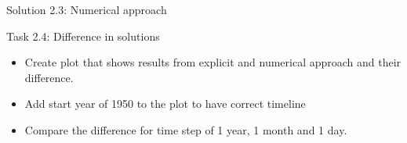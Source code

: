 \begin{frame}[fragile]{Solution 2.3:  Numerical approach } 
\end{frame}


\begin{frame}{Task 2.4: Difference in solutions}
\begin{itemize}
    \item Create plot that shows results from explicit and numerical approach and their difference. 
    \item Add start year of 1950 to the plot to have correct timeline
    \item Compare the difference for time step of 1 year, 1 month and 1 day.
\end{itemize}

\end{frame}

